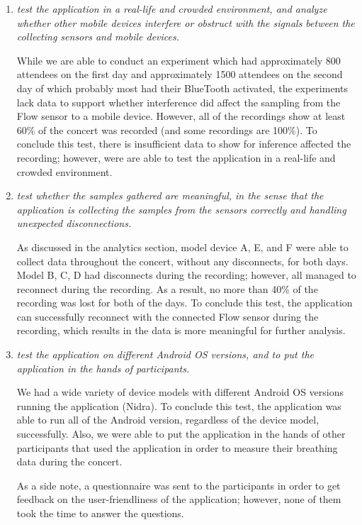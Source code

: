 \begin{enumerate}
    \item \textit{test the application in a real-life and crowded environment, and analyze whether other mobile devices interfere or obstruct with the signals between the collecting sensors and mobile devices.}
    
    While we are able to conduct an experiment which had approximately 800 attendees on the first day and approximately 1500 attendees on the second day of which probably most had their BlueTooth activated, the experiments lack data to support whether interference did affect the sampling from the Flow sensor to a mobile device. However, all of the recordings show at least 60\% of the concert was recorded (and some recordings are 100\%). To conclude this test, there is insufficient data to show for inference affected the recording; however, were are able to test the application in a real-life and crowded environment. 

    \item \textit{test whether the samples gathered are meaningful, in the sense that the application is collecting the samples from the sensors correctly and handling unexpected disconnections.}
    
    As discussed in the analytics section, model device A, E, and F were able to collect data throughout the concert, without any disconnects, for both days. Model B, C, D had disconnects during the recording; however, all managed to reconnect during the recording. As a result, no more than 40\% of the recording was lost for both of the days. To conclude this test, the application can successfully reconnect with the connected Flow sensor during the recording, which results in the data is more meaningful for further analysis. 

    \item \textit{test the application on different Android OS versions, and to put the application in the hands of participants.} 
    
    We had a wide variety of device models with different Android OS versions running the application (Nidra). To conclude this test, the application was able to run all of the Android version, regardless of the device model, successfully. Also, we were able to put the application in the hands of other participants that used the application in order to measure their breathing data during the concert.

    As a side note, a questionnaire was sent to the participants in order to get feedback on the user-friendliness of the application; however, none of them took the time to answer the questions.


\end{enumerate}


